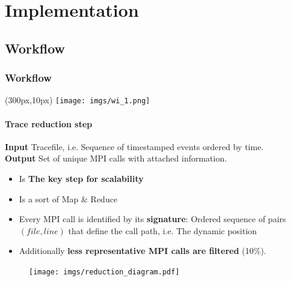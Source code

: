 \documentclass{beamer}
\begin{document}
\section{Implementation}
\subsection{Workflow}

\begin{frame}
\frametitle{Workflow}
\begin{textblock*}{5cm}(300px,10px) %
	\texttt{[image: imgs/wi\_1.png]}
\end{textblock*}
\framesubtitle{Trace reduction step}
\begin{mdframed}[backgroundcolor=blue!10,roundcorner=10pt,linewidth=0pt]
	\textbf{Input} Tracefile, i.e. Sequence of timestamped events ordered by time.\\
	\textbf{Output} Set of unique MPI calls with attached information.
\end{mdframed}
\vspace{10px}
\pause
\begin{itemize}
	\item Is \textbf{The key step for scalability}
	\item Is a sort of Map \& Reduce
	\item Every MPI call is identified by its \textbf{signature}: Ordered sequence of pairs $(file,line)$ that define the call path, i.e. The dynamic position
	\item Additionally \textbf{less representative MPI calls are filtered} (10\%). 
\end{itemize}
\pause
\begin{figure}
	\texttt{[image: imgs/reduction\_diagram.pdf]}
\end{figure}
\end{frame}
\end{document}
